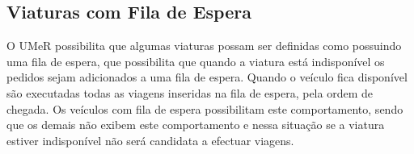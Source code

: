 \subsection{Viaturas com Fila de Espera}
O UMeR possibilita que algumas viaturas possam ser definidas como possuindo uma fila de espera,
que possibilita que quando a viatura está indisponível os pedidos sejam adicionados a uma fila de espera. Quando o veículo fica disponível são executadas todas as viagens inseridas na fila de espera, pela ordem de chegada. Os veículos com fila de espera possibilitam este comportamento, sendo que os demais não exibem este comportamento e nessa situação se a viatura estiver indisponível não será candidata a efectuar viagens.
